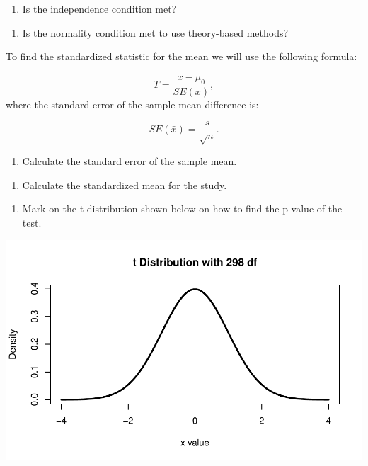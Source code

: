 \documentclass[
]{report}
\providecommand{\tightlist}{%
  \setlength{\itemsep}{0pt}\setlength{\parskip}{0pt}}
\begin{document}
\begin{enumerate}
\def\labelenumi{\arabic{enumi}.}
\setcounter{enumi}{8}
\tightlist
\item
  Is the independence condition met?
\end{enumerate}

\vspace{0.5in}

\begin{enumerate}
\def\labelenumi{\arabic{enumi}.}
\setcounter{enumi}{9}
\tightlist
\item
  Is the normality condition met to use theory-based methods?
\end{enumerate}

\vspace{1in}

To find the standardized statistic for the mean we will use the following formula:

\[T = \frac{\bar{x} - \mu_0}{SE(\bar{x})},\]
where the standard error of the sample mean difference is:

\[SE(\bar{x})=\frac{s}{\sqrt{n}}.\]

\begin{enumerate}
\def\labelenumi{\arabic{enumi}.}
\setcounter{enumi}{10}
\tightlist
\item
  Calculate the standard error of the sample mean.
\end{enumerate}

\vspace{0.8in}

\begin{enumerate}
\def\labelenumi{\arabic{enumi}.}
\setcounter{enumi}{11}
\tightlist
\item
  Calculate the standardized mean for the study.
\end{enumerate}

\vspace{1in}

\newpage

\begin{enumerate}
\def\labelenumi{\arabic{enumi}.}
\setcounter{enumi}{12}
\tightlist
\item
  Mark on the t-distribution shown below on how to find the p-value of the test.
\end{enumerate}

\begin{center}\includegraphics[width=0.7\linewidth]{10-UR-module6_review_files/figure-latex/tdistave-1} \end{center}
\end{document}
